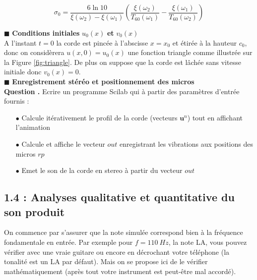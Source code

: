 \documentclass[a4,12pt]{article}
\newcommand{\ub}{\mathbf{u}}
\newcounter{Nbquestion}
\newcommand*\question{%
  \stepcounter{Nbquestion}%
  \textbf{Question \theNbquestion. }}
\begin{document}
	    \[
	      \sigma_0=\frac{6 \ln 10}{\xi(\omega_2)-\xi(\omega_1)}\left(\frac{\xi(\omega_2)}{T_{60}(\omega_1)}-\frac{\xi(\omega_1)}{T_{60}(\omega_2)}\right)
	    \]


	    \hspace{0.5cm} $\blacksquare$ \textbf{Conditions initiales} $u_0(x)$ \textbf{et} $v_0(x)$\\

	    A l'instant $t=0$ la corde est pincée à l'abscisse $x=x_0$ et étirée à la hauteur $c_0$, donc on considèrera $u(x,0)=u_0(x)$ une fonction triangle comme illustrée sur la Figure \ref{fig:triangle}. De plus on suppose que la corde est lâchée sans vitesse initiale donc $v_0(x)=0$.\\

	    \hspace{0.5cm} $\blacksquare$ \textbf{Enregistrement stéréo et positionnement des micros}\\


	    \question Ecrire un programme Scilab qui à partir des paramètres d'entrée fournis : \\

	    \begin{itemize}
	      \item[$\bullet$] Calcule itérativement le profil de la corde (vecteurs $\ub^n$) tout en affichant l'animation\\
	      \item[$\bullet$] Calcule et affiche le vecteur $out$ enregistrant les vibrations aux positions des micros $rp$\\ 	\item[$\bullet$] Emet le son de la corde en stereo à partir du vecteur $out$
	    \end{itemize}


	    \subsection*{1.4 : Analyses qualitative et quantitative du son produit}

	    On commence par s'assurer que la note simulée correspond bien à la fréquence fondamentale en entrée. Par exemple pour $f=110~Hz$, la note LA, vous pouvez vérifier avec une vraie guitare ou encore en décrochant votre téléphone (la tonalité est un LA par défaut). Mais on se propose ici de le vérifier mathématiquement (après tout votre instrument est peut-être mal accordé). 
\end{document}

